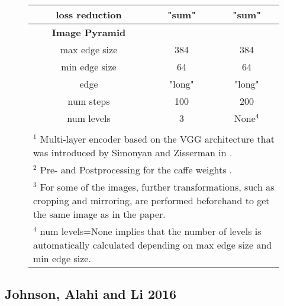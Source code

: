 \begin{figure}[H]
\begin{center}
\begin{rotate}{90}
\begin{tabular}{c|c|c}
			loss reduction & "sum" & "sum" \\
			\hline
			\bfseries  Image Pyramid & & \\
			\hline
			max edge size & 384 & 384 \\
			min edge size & 64 & 64 \\
			edge & "long" & "long" \\
			num steps & 100 & 200 \\
			num levels & 3 & None$^4$ \\
			\hline
			\multicolumn{3}{l}{ }\\
			\multicolumn{3}{l}{\scriptsize{$^1$ Multi-layer encoder based on the VGG architecture that was introduced by Simonyan and Zisserman in \cite{SZ2015}.}}\\
			\multicolumn{3}{l}{\scriptsize{$^2$ Pre- and Postprocessing for the caffe weights \cite{SZ2015}.}}\\
			\multicolumn{3}{l}{\scriptsize{$^3$ For some of the images, further transformations, such as cropping and mirroring, are performed beforehand to get the same image as in the paper.}}\\
			\multicolumn{3}{l}{\scriptsize{$^4$ num levels=None implies that the number of levels is automatically calculated depending on max edge size and min edge size.}}
		\end{tabular}
\end{rotate}
\label{tab:LW2016_parameters}
\end{center}
\end{figure}

\subsection{Johnson, Alahi and Li 2016}

